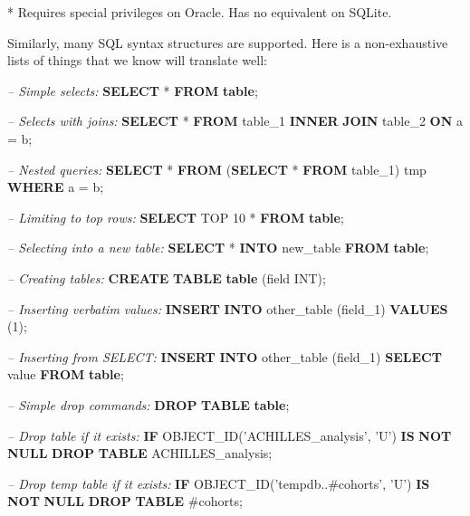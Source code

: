\documentclass[11pt]{book}
\newenvironment{Shaded}{\begin{snugshade}}{\end{snugshade}}
\newcommand{\KeywordTok}[1]{\textcolor[rgb]{0.13,0.29,0.53}{\textbf{#1}}}
\newcommand{\DataTypeTok}[1]{\textcolor[rgb]{0.13,0.29,0.53}{#1}}
\newcommand{\DecValTok}[1]{\textcolor[rgb]{0.00,0.00,0.81}{#1}}
\newcommand{\StringTok}[1]{\textcolor[rgb]{0.31,0.60,0.02}{#1}}
\newcommand{\CommentTok}[1]{\textcolor[rgb]{0.56,0.35,0.01}{\textit{#1}}}
\newcommand{\FunctionTok}[1]{\textcolor[rgb]{0.00,0.00,0.00}{#1}}
\newcommand{\NormalTok}[1]{#1}
\begin{document}
* Requires special privileges on Oracle. Has no equivalent on SQLite.

Similarly, many SQL syntax structures are supported. Here is a
non-exhaustive lists of things that we know will translate well:

\begin{Shaded}
\begin{Highlighting}[]
\CommentTok{-- Simple selects:}
\KeywordTok{SELECT}\NormalTok{ * }\KeywordTok{FROM} \KeywordTok{table}\NormalTok{;}

\CommentTok{-- Selects with joins:}
\KeywordTok{SELECT}\NormalTok{ * }\KeywordTok{FROM}\NormalTok{ table_1 }\KeywordTok{INNER} \KeywordTok{JOIN}\NormalTok{ table_2 }\KeywordTok{ON}\NormalTok{ a = b;}

\CommentTok{-- Nested queries:}
\KeywordTok{SELECT}\NormalTok{ * }\KeywordTok{FROM}\NormalTok{ (}\KeywordTok{SELECT}\NormalTok{ * }\KeywordTok{FROM}\NormalTok{ table_1) tmp }\KeywordTok{WHERE}\NormalTok{ a = b;}

\CommentTok{-- Limiting to top rows:}
\KeywordTok{SELECT}\NormalTok{ TOP }\DecValTok{10}\NormalTok{ * }\KeywordTok{FROM} \KeywordTok{table}\NormalTok{;}

\CommentTok{-- Selecting into a new table:}
\KeywordTok{SELECT}\NormalTok{ * }\KeywordTok{INTO}\NormalTok{ new_table }\KeywordTok{FROM} \KeywordTok{table}\NormalTok{;}

\CommentTok{-- Creating tables:}
\KeywordTok{CREATE} \KeywordTok{TABLE} \KeywordTok{table}\NormalTok{ (field }\DataTypeTok{INT}\NormalTok{);}

\CommentTok{-- Inserting verbatim values:}
\KeywordTok{INSERT} \KeywordTok{INTO}\NormalTok{ other_table (field_1) }\KeywordTok{VALUES}\NormalTok{ (}\DecValTok{1}\NormalTok{);}

\CommentTok{-- Inserting from SELECT:}
\KeywordTok{INSERT} \KeywordTok{INTO}\NormalTok{ other_table (field_1) }\KeywordTok{SELECT} \FunctionTok{value} \KeywordTok{FROM} \KeywordTok{table}\NormalTok{;}
  
\CommentTok{-- Simple drop commands:}
\KeywordTok{DROP} \KeywordTok{TABLE} \KeywordTok{table}\NormalTok{;}

\CommentTok{-- Drop table if it exists:}
\KeywordTok{IF}\NormalTok{ OBJECT_ID(}\StringTok{'ACHILLES_analysis'}\NormalTok{, }\StringTok{'U'}\NormalTok{) }\KeywordTok{IS} \KeywordTok{NOT} \KeywordTok{NULL}
  \KeywordTok{DROP} \KeywordTok{TABLE}\NormalTok{ ACHILLES_analysis;}
  
\CommentTok{-- Drop temp table if it exists:}
\KeywordTok{IF}\NormalTok{ OBJECT_ID(}\StringTok{'tempdb..#cohorts'}\NormalTok{, }\StringTok{'U'}\NormalTok{) }\KeywordTok{IS} \KeywordTok{NOT} \KeywordTok{NULL}
  \KeywordTok{DROP} \KeywordTok{TABLE}\NormalTok{ #cohorts;  }


\end{Highlighting}
\end{Shaded}
\end{document}
